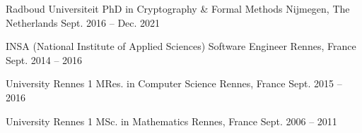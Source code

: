 

\begin{cventries}

    \cventryfour
    {Radboud Universiteit} %
    {PhD in Cryptography \& Formal Methods} %
    {Nijmegen, The Netherlands} %
    {Sept. 2016 -- Dec. 2021} %

    \cventryfour
    {INSA (National Institute of Applied Sciences)} %
    {Software Engineer} %
    {Rennes, France} %
    {Sept. 2014 -- 2016} %

    \cventryfour
    {University Rennes 1} %
    {MRes. in Computer Science} %
    {Rennes, France} %
    {Sept. 2015 -- 2016} %

    \cventryfour
    {University Rennes 1} %
    {MSc. in Mathematics} %
    {Rennes, France} %
    {Sept. 2006 -- 2011} %


\end{cventries}
